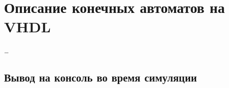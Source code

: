 \chapter{Описание конечных автоматов на VHDL}

\emph{\ldots}

\section{Вывод на консоль во время симуляции}
